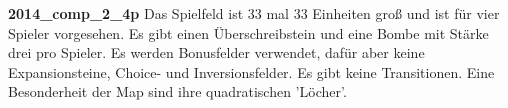 \documentclass[12pt,a4paper,bibliography=totocnumbered,listof=totocnumbered]{scrartcl}
\begin{document}
	\textbf{2014\_comp\_2\_4p}\newline
	Das Spielfeld ist 33 mal 33 Einheiten groß und ist für vier Spieler vorgesehen. Es gibt einen Überschreibstein und eine Bombe mit Stärke drei pro Spieler. Es werden Bonusfelder verwendet, dafür aber keine Expansionsteine, Choice- und Inversionsfelder. Es gibt keine Transitionen. Eine Besonderheit der Map sind ihre quadratischen 'Löcher'.\newline
	\vspace{1em}
	\begin{figure}
		\centering
		\qquad
		\qquad
		\qquad

\end{figure}
\end{document}
